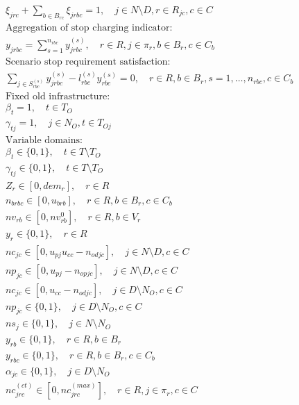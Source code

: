 \documentclass[11pt]{ctexart}
\begin{document}
\begin{align*}
& \xi_{jrc} + \sum_{b \in B_{rc}} \xi_{jrbc} = 1, \quad j \in N \setminus D, r \in R_{jc}, c \in C \tag{42} \\
&\text{Aggregation of stop charging indicator:} \\
& y_{jrbc} = \sum_{s=1}^{n_{rbc}} y^{(s)}_{jrbc}, \quad r \in R, j \in \pi_r, b \in B_r, c \in C_b \tag{43} \\
&\text{Scenario stop requirement satisfaction:} \\
& \sum_{j \in S^{(s)}_{rbc}} y^{(s)}_{jrbc} - l^{(s)}_{rbc} y^{(s)}_{rbc} = 0, \quad r \in R, b \in B_r, s = 1, \dots, n_{rbc}, c \in C_b \tag{44} \\
&\text{Fixed old infrastructure:} \\
& \beta_t = 1, \quad t \in T_O \tag{45} \\
& \gamma_{tj} = 1, \quad j \in N_O, t \in T_{Oj} \tag{46} \\
&\text{Variable domains:} \\
& \beta_t \in \{0, 1\}, \quad t \in T \setminus T_O \tag{47} \\
& \gamma_{tj} \in \{0, 1\}, \quad t \in T \setminus T_O \tag{48} \\
& Z_r \in [0, dem_r], \quad r \in R \tag{49} \\
& n_{brbc} \in [0, u_{brb}], \quad r \in R, b \in B_r, c \in C_b \tag{50} \\
& nv_{rb} \in [0, nv^0_{rb}], \quad r \in R, b \in V_r \tag{51} \\
& y_r \in \{0, 1\}, \quad r \in R \tag{52} \\
& nc_{jc} \in [0, u_{pj} u_{cc} - n_{odjc}], \quad j \in N \setminus D, c \in C \tag{53} \\
& np_{jc} \in [0, u_{pj} - n_{opjc}], \quad j \in N \setminus D, c \in C \tag{54} \\
& nc_{jc} \in [0, u_{cc} - n_{odjc}], \quad j \in D \setminus N_O, c \in C \tag{55} \\
& np_{jc} \in \{0, 1\}, \quad j \in D \setminus N_O, c \in C \tag{56} \\
& ns_j \in \{0, 1\}, \quad j \in N \setminus N_O \tag{57} \\
& y_{rb} \in \{0, 1\}, \quad r \in R, b \in B_r \tag{58} \\
& y_{rbc} \in \{0, 1\}, \quad r \in R, b \in B_r, c \in C_b \tag{59} \\
& \alpha_{jc} \in \{0, 1\}, \quad j \in D \setminus N_O \tag{60} \\
& nc^{(ct)}_{jrc} \in [0, nc^{(max)}_{jrc}], \quad r \in R, j \in \pi_r, c \in C \tag{61} \\

\end{align*}
\end{document}
